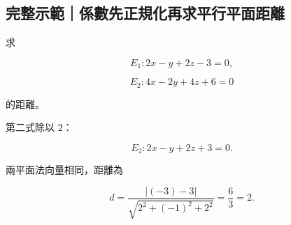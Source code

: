 \documentclass[11pt,a4paper]{article}
\begin{document}
\begin{HandoutWorkedExample}

\subsection{完整示範｜係數先正規化再求平行平面距離}\label{ux5b8cux6574ux793aux7bc4ux4fc2ux6578ux5148ux6b63ux898fux5316ux518dux6c42ux5e73ux884cux5e73ux9762ux8dddux96e2}

求

\[
E_1:2x-y+2z-3=0,
\]

\[
E_2:4x-2y+4z+6=0
\]

的距離。

第二式除以 \(2\)：

\[
E_2:2x-y+2z+3=0.
\]

兩平面法向量相同，距離為

\[
d=\frac{|(-3)-3|}{\sqrt{2^2+(-1)^2+2^2}}
=\frac6{3}
=\boxed2.
\]

\end{HandoutWorkedExample}
\end{document}
